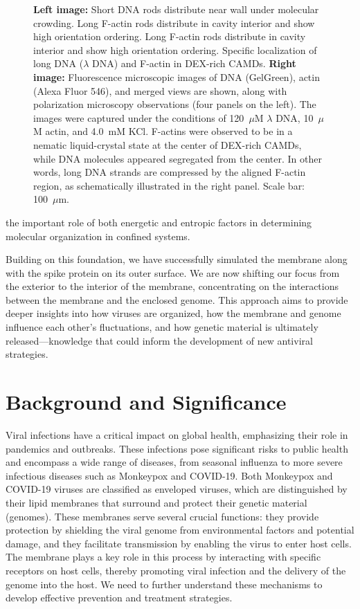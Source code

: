 \documentclass[12pt]{article}
\begin{document}
\begin{flushleft}
\begin{figure}[!ht]
  \caption{\textbf{Left image:} Short DNA rods distribute near wall under molecular crowding. Long F-actin rods distribute in cavity interior and show high orientation ordering. Long F-actin rods distribute in cavity interior and show high orientation ordering.  Specific localization of 
  long DNA ($\lambda$ DNA) and F-actin in DEX-rich CAMDs.    
       \textbf{Right image:} Fluorescence microscopic images of DNA (GelGreen), actin (Alexa Fluor 546), and merged views are shown, along with polarization microscopy observations (four panels on the left). 
        The images were captured under the conditions of 120~$\mu$M $\lambda$ DNA, 10~$\mu$M actin, and 4.0~mM KCl. 
        F-actins were observed to be in a nematic liquid-crystal state at the center of DEX-rich CAMDs, while DNA molecules appeared segregated from the center. 
        In other words, long DNA strands are compressed by the aligned F-actin region, as schematically illustrated in the right panel. 
        Scale bar: 100~$\mu$m.\cite {nakatani2018}}
\end{figure}



 \noindent  the important role of both energetic and entropic factors in determining molecular organization in confined systems.


Building on this foundation, we have successfully simulated the membrane along with the spike protein on its outer surface. We are now shifting our focus from the exterior to the interior of the membrane, concentrating on the interactions between the membrane and the enclosed genome. This approach aims to provide deeper insights into how viruses are organized, how the membrane and genome influence each other’s fluctuations, and how genetic material is ultimately released—knowledge that could inform the development of new antiviral strategies.



\vspace{-1em} 
\section*{Background and Significance}
Viral infections have a critical impact on global health, emphasizing their role in pandemics and outbreaks. These infections pose significant risks to public health and encompass a wide range of diseases, from seasonal influenza to more severe infectious diseases such as Monkeypox and COVID-19. Both Monkeypox and COVID-19 viruses are classified as enveloped viruses, which are distinguished by their lipid membranes that surround and protect their genetic material (genomes). These membranes serve several crucial functions: they provide protection by shielding the viral genome from environmental factors and potential damage, and they facilitate transmission by enabling the virus to enter host cells. The membrane plays a key role in this process by interacting with specific receptors on host cells, thereby promoting viral infection and the delivery of the genome into the host. We need to further understand these mechanisms to develop effective prevention and treatment strategies.





\end{flushleft}
\end{document}
